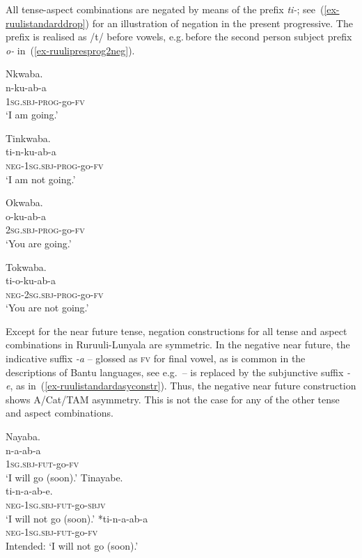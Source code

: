 All tense-aspect combinations are negated by means of the prefix \textit{ti-}; 
see~(\ref{ex-ruulistandarddrop}) for an illustration of negation in the present progressive. 
The prefix is realised as /t/ before vowels, e.g.\,before the second person subject prefix \textit{o-} in~(\ref{ex-ruulipresprog2neg}).

\ea 
\label{ex-ruulistandarddrop}
\begin{xlist}

\ex
\label{ex-ruulipresprog1}
	\glll Nkwaba.\\
	n-ku-ab-a\\
	\textsc{1sg.sbj}-\textsc{prog}-go-\textsc{fv}\\
	\glt ‘I am going.’ 
	
\ex \label{ex-ruulipresprog1neg}
	\glll Tinkwaba.\\
	  ti-n-ku-ab-a\\
		\textsc{neg}-\textsc{1sg.sbj}-\textsc{prog}-go-\textsc{fv}\\
	\glt ‘I am not going.’ 	
	
\ex \label{ex-ruulipresprog2}
	\glll Okwaba.\\
	 	o-ku-ab-a\\
		2\textsc{sg.sbj}-\textsc{prog}-go-\textsc{fv}\\
	\glt ‘You are going.’ 
	
\ex \label{ex-ruulipresprog2neg}
	\glll Tokwaba.\\
	  	ti-o-ku-ab-a\\
		\textsc{neg}-2\textsc{sg.sbj}-\textsc{prog}-go-\textsc{fv}\\
	\glt ‘You are not going.' 
\end{xlist}
\z

Except for the near future tense, negation constructions for all tense and aspect combinations in Ru\-ruu\-li\hyp{}Lu\-nya\-la are symmetric. 
In the negative near future, the indicative suffix \textit{-a} – glossed as \textsc{fv} for final vowel, as is common in the descriptions of Bantu languages, see e.g.\,\citet[44]{Nurse2008Tense} – is replaced by the subjunctive suffix \textit{-e}, as in~(\ref{ex-ruulistandardasyconstr}).
Thus, the negative near future construction shows A/Cat/TAM asymmetry. 
This is not the case for any of the other tense and aspect combinations. 

\ea 
\label{ex-ruulistandardasyconstr}
\begin{xlist}
\ex
\label{ex-ruulinear.future}
	\glll  Nayaba.\\
	n-a-ab-a\\
	\textsc{1sg.sbj}-\textsc{fut}-go-\textsc{fv}\\
	\glt ‘I will go (soon).’ 
\ex
\label{ex-ruulinear.futureneg}
	\glll Tinayabe.\\
		ti-n-a-ab-e.\\
		\textsc{neg}-\textsc{1sg.sbj}-\textsc{fut}-go-\textsc{sbjv}\\
	\glt ‘I will not go (soon).’ 	
\ex
\label{ex-ruulinear.futureasterix}
	*\gll ti-n-a-ab-a\\
		\textsc{neg}-\textsc{1sg.sbj}-\textsc{fut}-go-\textsc{fv}\\
\glt Intended: ‘I will not go (soon).’
\end{xlist}
\z

